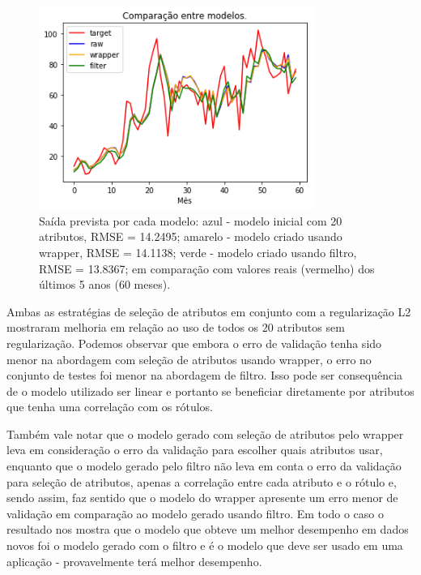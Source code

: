 \documentclass[a4paper, 12pt]{article}
\begin{document}
\begin{figure}[h!]
    \centering
  \includegraphics[width=9cm]{images/comparison.png}
    \caption{Saída prevista por cada modelo: azul - modelo inicial com 20 atributos, RMSE = 14.2495; amarelo - modelo criado usando wrapper, RMSE = 14.1138; verde - modelo criado usando filtro, RMSE = 13.8367;  em comparação com valores reais (vermelho) dos últimos 5 anos (60 meses).}
\end{figure}


\hspace{2em} Ambas as estratégias de seleção de atributos em conjunto com a regularização L2 mostraram melhoria em relação ao uso de todos os 20 atributos sem regularização. Podemos observar que embora o erro de validação tenha sido menor na abordagem com seleção de atributos usando wrapper, o erro no conjunto de testes foi menor na abordagem de filtro. Isso pode ser consequência de o modelo utilizado ser linear e portanto se beneficiar diretamente por atributos que tenha uma correlação com os rótulos.

\hspace{2em} Também vale notar que o modelo gerado com seleção de atributos pelo wrapper leva em consideração o erro da validação para escolher quais atributos usar, enquanto que o modelo gerado pelo filtro não leva em conta o erro da validação para seleção de atributos, apenas a correlação entre cada atributo e o rótulo e, sendo assim, faz sentido que o modelo do wrapper apresente um erro menor de validação em comparação ao modelo gerado usando filtro. Em todo o caso o resultado nos mostra que o modelo que obteve um melhor desempenho em dados novos foi o modelo gerado com o filtro e é o modelo que deve ser usado em uma aplicação - provavelmente terá melhor desempenho.
\end{document}
